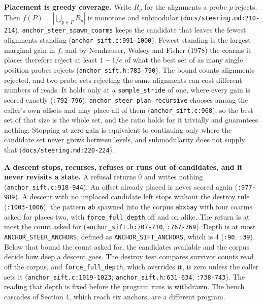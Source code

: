 \noindent\textbf{Placement is greedy coverage.} Write \(R_p\) for the alignments a probe \(p\) rejects. Then \(f(P) = |\bigcup_{p \in P} R_p|\) is monotone and submodular (\texttt{docs/\allowbreak{}steering.md:210-\allowbreak{}214}). \texttt{anchor\_\allowbreak{}steer\_\allowbreak{}spawn\_\allowbreak{}coarms} keeps the candidate that leaves the fewest alignments standing (\texttt{anchor\_sift.c:991-1000}). Fewest standing is the largest marginal gain in \(f\), and by Nemhauser, Wolsey and Fisher (1978) the coarms it places therefore reject at least \(1 - 1/e\) of what the best set of as many single position probes rejects (\texttt{anchor\_sift.h:783-790}). The bound counts alignments rejected, and two probe sets rejecting the same alignments can cost different numbers of reads. It holds only at a \texttt{sample\_stride} of one, where every gain is scored exactly (\texttt{:792-796}). \texttt{anchor\_steer\_plan\_recursive} chooses among the caller's own offsets and may place all of them (\texttt{anchor\_sift.c:968}), so the best set of that size is the whole set, and the ratio holds for it trivially and guarantees nothing. Stopping at zero gain is equivalent to continuing only where the candidate set never grows between levels, and submodularity does not supply that (\texttt{docs/\allowbreak{}steering.md:220-\allowbreak{}224}).

\noindent\textbf{A descent stops, recurses, refuses or runs out of candidates, and it never revisits a state.} A refusal returns 0 and writes nothing (\texttt{anchor\_sift.c:918-944}). An offset already placed is never scored again (\texttt{:977-989}). A descent with no unplaced candidate left stops without the destroy rule (\texttt{:1003-1006}): the pattern \texttt{ab} spawned into the corpus \texttt{abxbay} with four coarms asked for places two, with \texttt{force\_full\_depth} off and on alike. The return is at most the count asked for (\texttt{anchor\_sift.h:707-710}, \texttt{:767-769}). Depth is at most \texttt{ANCHOR\_STEER\_ANCHORS}, defined as \texttt{ANCHOR\_SIFT\_ANCHORS}, which is 4 (\texttt{:90}, \texttt{:39}). Below that bound the count asked for, the candidates available and the corpus decide how deep a descent goes. The destroy test compares survivor counts read off the corpus, and \texttt{force\_full\_depth}, which overrides it, is zero unless the caller sets it (\texttt{anchor\_sift.c:1019-1023}; \texttt{anchor\_sift.h:631-634}, \texttt{:738-743}). The reading that depth is fixed before the program runs is withdrawn. The bench cascades of Section 4, which reach six anchors, are a different program.

